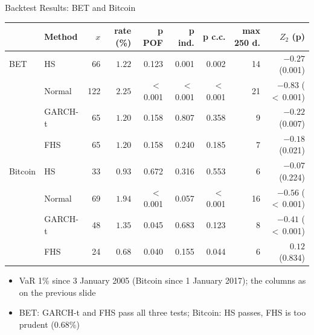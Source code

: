 \begin{frame}{Backtest Results: BET and Bitcoin}
\itemsize{\footnotesize}
\begin{center}
\scriptsize
\begin{tabular}{llrrrrrrr}
\toprule
& Method & $x$ & rate (\%) & p POF & p ind. & p c.c. & max 250 d. & $Z_2$ (p) \\
\midrule
BET & HS & 66 & $1.22$ & 0.123 & 0.001 & 0.002 & 14 & ${-0.27}$ (0.001) \\
 & Normal & 122 & $2.25$ & $<$\,0.001 & $<$\,0.001 & $<$\,0.001 & 21 & ${-0.83}$ ($<$\,0.001) \\
 & GARCH-t & 65 & $1.20$ & 0.158 & 0.807 & 0.358 & 9 & ${-0.22}$ (0.007) \\
 & FHS & 65 & $1.20$ & 0.158 & 0.240 & 0.185 & 7 & ${-0.18}$ (0.021) \\
\midrule
Bitcoin & HS & 33 & $0.93$ & 0.672 & 0.316 & 0.553 & 6 & ${-0.07}$ (0.224) \\
 & Normal & 69 & $1.94$ & $<$\,0.001 & 0.057 & $<$\,0.001 & 16 & ${-0.56}$ ($<$\,0.001) \\
 & GARCH-t & 48 & $1.35$ & 0.045 & 0.683 & 0.123 & 8 & ${-0.41}$ ($<$\,0.001) \\
 & FHS & 24 & $0.68$ & 0.040 & 0.155 & 0.044 & 6 & ${0.12}$ (0.834) \\
\bottomrule
\end{tabular}
\end{center}
\begin{itemize}
    \item VaR 1\% since 3 January 2005 (Bitcoin since 1 January 2017); the columns as on the previous slide
    \item BET: GARCH-t and FHS pass all three tests; Bitcoin: HS passes, FHS is too prudent ($0.68\%$)
\end{itemize}
\end{frame}

